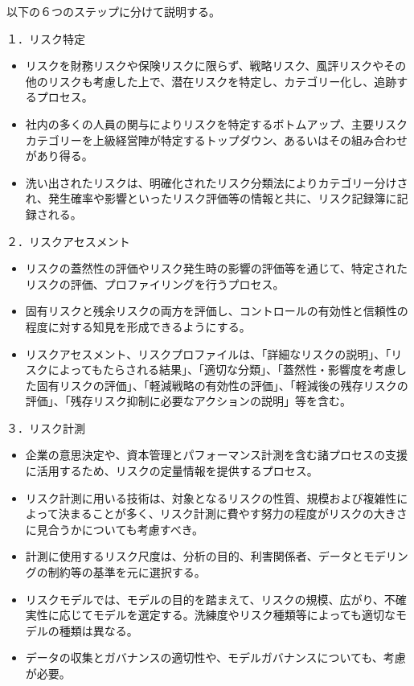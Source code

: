 \documentclass[report,gutter=10mm,fore-edge=10mm,uplatex,dvipdfmx]{jlreq}
\begin{document}
以下の６つのステップに分けて説明する。

１．リスク特定
\begin{itemize}
\item[]  リスクを財務リスクや保険リスクに限らず、戦略リスク、風評リスクやその他のリスクも考慮した上で、潜在リスクを特定し、カテゴリー化し、追跡するプロセス。
\item[]  社内の多くの人員の関与によりリスクを特定するボトムアップ、主要リスクカテゴリーを上級経営陣が特定するトップダウン、あるいはその組み合わせがあり得る。
\item[]  洗い出されたリスクは、明確化されたリスク分類法によりカテゴリー分けされ、発生確率や影響といったリスク評価等の情報と共に、リスク記録簿に記録される。
\end{itemize}

２．リスクアセスメント
\begin{itemize}
\item[] リスクの蓋然性の評価やリスク発生時の影響の評価等を通じて、特定されたリスクの評価、プロファイリングを行うプロセス。
\item[] 固有リスクと残余リスクの両方を評価し、コントロールの有効性と信頼性の程度に対する知見を形成できるようにする。
\item[] リスクアセスメント、リスクプロファイルは、「詳細なリスクの説明」、「リスクによってもたらされる結果」、「適切な分類」、「蓋然性・影響度を考慮した固有リスクの評価」、「軽減戦略の有効性の評価」、「軽減後の残存リスクの評価」、「残存リスク抑制に必要なアクションの説明」等を含む。
\end{itemize}

３．リスク計測
\begin{itemize}
\item[] 企業の意思決定や、資本管理とパフォーマンス計測を含む諸プロセスの支援に活用するため、リスクの定量情報を提供するプロセス。
\item[] リスク計測に用いる技術は、対象となるリスクの性質、規模および複雑性によって決まることが多く、リスク計測に費やす努力の程度がリスクの大きさに見合うかについても考慮すべき。
\item[] 計測に使用するリスク尺度は、分析の目的、利害関係者、データとモデリングの制約等の基準を元に選択する。
\item[] リスクモデルでは、モデルの目的を踏まえて、リスクの規模、広がり、不確実性に応じてモデルを選定する。洗練度やリスク種類等によっても適切なモデルの種類は異なる。
\item[] データの収集とガバナンスの適切性や、モデルガバナンスについても、考慮が必要。
\end{itemize}
\end{document}
